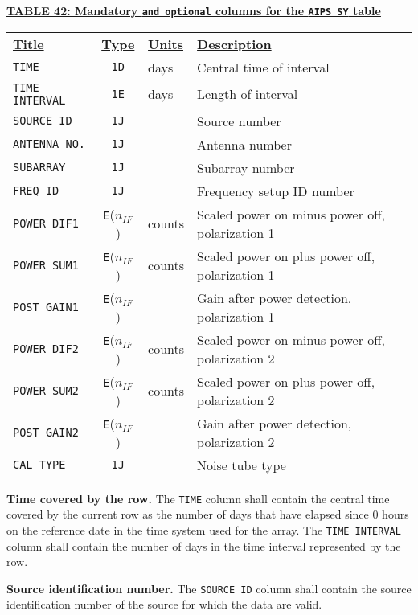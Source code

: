 \documentclass[twoside]{article}
\newcommand{\Hi}[1]{\textcolor{hicol}{#1}}
\newcommand{\nif}{$n_{IF}$}
\begin{document}
\begin{center}
\underline{\bf{TABLE 42: Mandatory \Hi{{\tt and optional}} columns for the {\tt AIPS SY} table}}\\
\begin{tabular}{lcll}
\noalign{\vspace{2pt}} \label{ta:SYcols}
\underline{{\bf Title\vphantom{y}}} & \underline{\bf{Type}} &
   \underline{{\bf Units\vphantom{y}}} & \underline{\bf{Description}} \\
\noalign{\vspace{2pt}}
{\tt TIME}          & {\tt 1D} & days & Central time of interval \\
{\tt TIME INTERVAL} & {\tt 1E} & days & Length of interval \\
{\tt SOURCE ID}     & {\tt 1J} &      & Source number \\
{\tt ANTENNA NO.}   & {\tt 1J} &      & Antenna number \\
{\tt SUBARRAY}      & {\tt 1J} &      & Subarray number \\
{\tt FREQ ID}       & {\tt 1J} &      & Frequency setup ID number \\
{\tt POWER DIF1}    & {\tt E}(\nif) & counts & Scaled power on minus power off, polarization 1\\
{\tt POWER SUM1}    & {\tt E}(\nif) & counts & Scaled power on plus power off, polarization 1 \\
{\tt POST GAIN1}    & {\tt E}(\nif) &  & Gain after power detection, polarization 1 \\
\hline
{\tt POWER DIF2}    & {\tt E}(\nif) & counts & Scaled power on minus power off, polarization 2\\
{\tt POWER SUM2}    & {\tt E}(\nif) & counts & Scaled power on plus power off, polarization 2 \\
{\tt POST GAIN2}    & {\tt E}(\nif) &  & Gain after power detection, polarization 2\\
\hline
\Hi{{\tt CAL TYPE}} & \Hi{{\tt 1J}} &      & \Hi{Noise tube type}
\end{tabular}
\end{center}

{\bf Time covered by the row.}  The {\tt TIME} column shall contain
the central time covered by the current row as the number of days
that have elapsed since 0 hours on the reference date in the time
system used for the array.  The {\tt TIME INTERVAL} column shall
contain the number of days in the time interval represented by the
row.

{\bf Source identification number.}  The {\tt SOURCE ID} column shall
contain the source identification number of the source for which the
data are valid.
\end{document}
